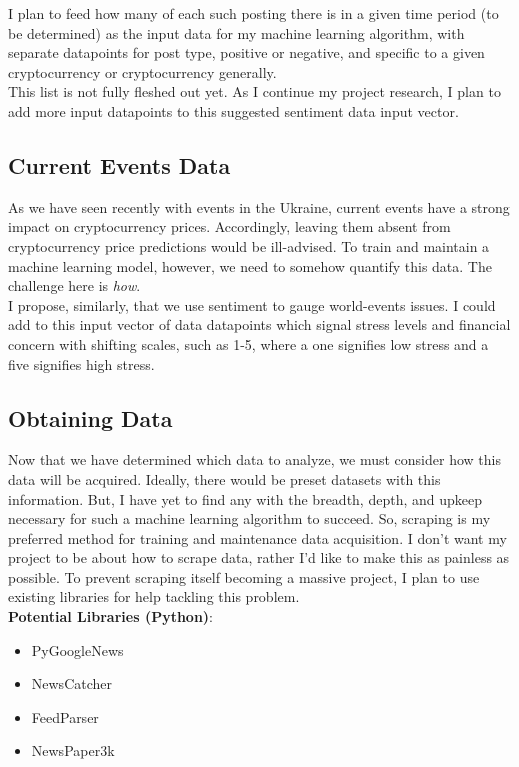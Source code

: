 \documentclass{article}
\begin{document}
I plan to feed how many of each such posting there is in a given time period (to be determined) as the input data for my machine learning algorithm, with separate datapoints for post type, positive or negative, and specific to a given cryptocurrency or cryptocurrency generally. \\

This list is not fully fleshed out yet. As I continue my project research, I plan to add more input datapoints to this suggested sentiment data input vector.

\subsection{Current Events Data}
\label{sec:currentevents}

As we have seen recently with events in the Ukraine, current events have a strong impact on cryptocurrency prices. Accordingly, leaving them absent from cryptocurrency price predictions would be ill-advised. To train and maintain a machine learning model, however, we need to somehow quantify this data. The challenge here is \textit{how}. \\

I propose, similarly, that we use sentiment to gauge world-events issues. I could add to this input vector of data datapoints which signal stress levels and financial concern with shifting scales, such as 1-5, where a one signifies low stress and a five signifies high stress.

\subsection{Obtaining Data}
\label{sec:dataacquisition}

Now that we have determined which data to analyze, we must consider how this data will be acquired. Ideally, there would be preset datasets with this information. But, I have yet to find any with the breadth, depth, and upkeep necessary for such a machine learning algorithm to succeed. So, scraping is my preferred method for training and maintenance data acquisition. I don’t want my project to be about how to scrape data, rather I’d like to make this as painless as possible. To prevent scraping itself becoming a massive project, I plan to use existing libraries for help tackling this problem. \\

\textbf{Potential Libraries (Python)}:

\begin{itemize}
    \item PyGoogleNews
    \item NewsCatcher
    \item FeedParser
    \item NewsPaper3k
\end{itemize}
\end{document}
